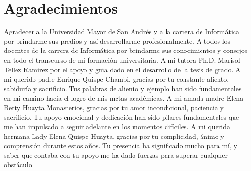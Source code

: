 \chapter*{Agradecimientos}

Agradecer a la Universidad Mayor de San Andrés y a la carrera de Informática por brindarme sus predios y así desarrollarme profesionalmente.
A todos los docentes de la carrera de Informática por brindarme sus conocimientos y consejos en todo el transcurso de mi formación universitaria.
A mi tutora Ph.D. Marisol Tellez Ramirez por el apoyo y guía dado en el desarrollo de la tesis de grado.
A mi querido padre Enrique Quispe Chambi, gracias por tu constante aliento, sabiduría y sacrificio. Tus palabras de aliento y ejemplo han sido fundamentales en mi camino hacia el logro de mis metas académicas.
A mi amada madre Elena Betty Huayta Monasterios, gracias por tu amor incondicional, paciencia y sacrificio. Tu apoyo emocional y dedicación han sido pilares fundamentales que me han impulsado a seguir adelante en los momentos difíciles.
A mi querida hermana Lady Elena Quispe Huayta, gracias por tu complicidad, ánimo y comprensión durante estos años. Tu presencia ha significado mucho para mí, y saber que contaba con tu apoyo me ha dado fuerzas para superar cualquier obstáculo.
